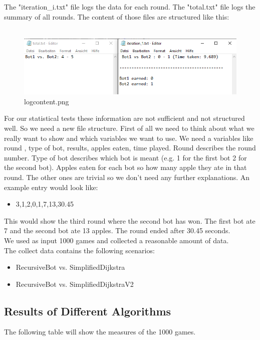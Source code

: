 \documentclass[a4paper,12pt]{article}
\begin{document}
The "iteration\_i.txt" file logs the data for each round. The "total.txt" file logs the summary of all rounds. The content of those files are structured like this:\\
\\
\begin{figure}[H]
    \centering
    \includegraphics[scale=0.8]{logs_content}
\caption{logcontent.png}
    \label{fig:logs_content.png}
\end{figure}
For our statistical tests these information are not sufficient and not structured well. So we need a new file structure. First of all we need to think about what we really want to show and which variables we want to use. We need a variables like round , type of bot, results, apples eaten, time played. Round describes the round number. Type of bot describes which bot is meant (e.g. 1 for the first bot 2 for the second bot). Apples eaten for each bot so how many apple they ate in that round. The other ones are trivial so we don't need any further explanations. An example entry would look like:
\begin{itemize}
	\item 3,1,2,0,1,7,13,30.45
\end{itemize}
This would show the third round where the second bot has won. The first bot ate 7 and the second bot ate 13 apples. The round ended after 30.45 seconds.\\
We used as input 1000 games and collected a reasonable amount of data. 
\\The collect data contains the following scenarios:
\begin{itemize}
\item RecursiveBot vs. SimplifiedDijkstra
\item RecursiveBot vs. SimplifiedDijkstraV2
\end{itemize}
\subsection{Results of Different Algorithms}
The following table will show the measures of the 1000 games.\\
\end{document}

